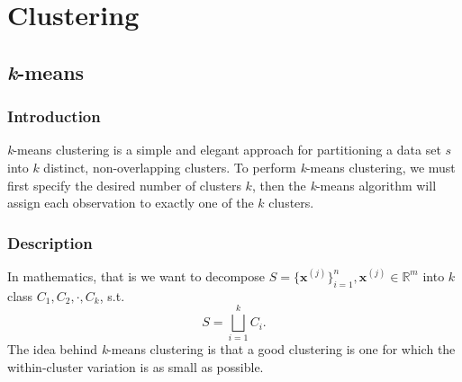 \chapter{Clustering}


\newpage
\section{\textit{k}-means}


\subsection{Introduction}

\textit{k}-means clustering is a simple and elegant approach for partitioning a
data set $s$ into $k$ distinct, non-overlapping clusters. To perform \textit{k}-means clustering, we must first specify the desired number of clusters $k$, then the \textit{k}-means algorithm will assign each observation to exactly one of the $k$ clusters.


\subsection{Description}
In mathematics, that is we want to decompose $S = \{\boldsymbol x ^{(j)}\}_{i=1}^{n},\boldsymbol x ^{(j)}\in\mathbb{R}^m$ into $k$ class $C_1,C_2,\cdot,C_k$, s.t.
\[
	S = \bigsqcup _{i=1}^{k} C_i.
\]
The idea behind \textit{k}-means clustering is that a good clustering is one for which the within-cluster variation is as small as possible.

